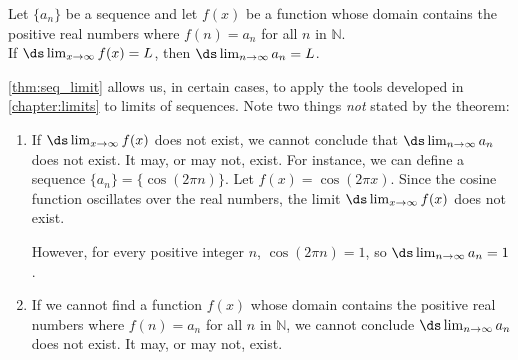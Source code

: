 \begin{theorem}\label{thm:seq_limit}
Let $\{a_n\}$ be a sequence and let $f(x)$ be a function whose domain contains the positive real numbers where $f(n) = a_n$ for all $n$ in $\mathbb{N}$. \\

If $\ds \lim_{x\to\infty} f(x) = L$, then $\ds\lim_{n\to\infty} a_n = L$.
\end{theorem}

\autoref{thm:seq_limit} allows us, in certain cases, to apply the tools developed in \autoref{chapter:limits} to limits of sequences. Note two things \textit{not} stated by the theorem:
	\begin{enumerate}
		\item If $\ds \lim_{x\to\infty}f(x)$ does not exist, we cannot conclude that $\ds\lim_{n\to\infty} a_n$ does not exist. It may, or may not, exist. For instance, we can define a sequence $\{a_n\} = \{\cos(2\pi n)\}$. Let $f(x) = \cos (2\pi x)$. Since the cosine function oscillates over the real numbers, the limit $\ds \lim_{x\to\infty}f(x)$ does not exist. 
		
		However, for every positive integer $n$, $\cos(2\pi n) = 1$, so $\ds \lim_{n\to\infty} a_n = 1$.
		
		\item	If we cannot find a function $f(x)$ whose domain contains the positive real numbers where $f(n) = a_n$ for all $n$ in $\mathbb{N}$, we cannot conclude $\ds\lim_{n\to\infty} a_n$ does not exist. It may, or may not, exist.
	\end{enumerate}


